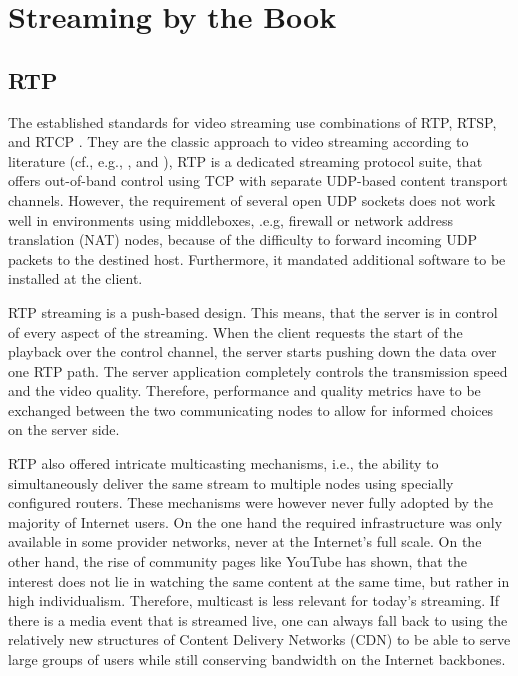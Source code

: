 \section{Streaming by the Book}
\subsection{RTP}


The established standards for video streaming use combinations of RTP, RTSP, and RTCP \cite{rfc3550, rfc2326}. They are the classic approach to video streaming according to literature (cf., e.g., \cite[p.~589ff]{kurose2008computer}, and \cite[p.~426ff]{peterson2007computer}),  RTP is a dedicated streaming protocol suite, that offers out-of-band control using TCP with separate UDP-based content transport channels. However, the requirement of several open UDP sockets does not work well in environments using middleboxes, .e.g, firewall or network address translation (NAT) nodes, because of the difficulty to forward incoming UDP packets to the destined host. Furthermore, it mandated additional software to be installed at the client. 

RTP streaming is a push-based design. This means, that the server is in control of every aspect of the streaming. When the client requests the start of the playback over the control channel, the server starts pushing down the data over one RTP path. The server application completely controls the transmission speed and the video quality. Therefore, performance and quality metrics have to be exchanged between the two communicating nodes to allow for informed choices on the server side.

RTP also offered intricate multicasting mechanisms, i.e., the ability to simultaneously deliver the same stream to multiple nodes using specially configured routers. These mechanisms were however never fully adopted by the majority of Internet users. On the one hand the required infrastructure was only available in some provider networks, never at the Internet's full scale. On the other hand, the rise of community pages like YouTube has shown, that the interest does not lie in watching the same content at the same time, but rather in high individualism. Therefore, multicast is less relevant for today's streaming. If there is a media event that is streamed live, one can always fall back to using the relatively new structures of Content Delivery Networks (CDN) to be able to serve large groups of users while still conserving bandwidth on the Internet backbones.

